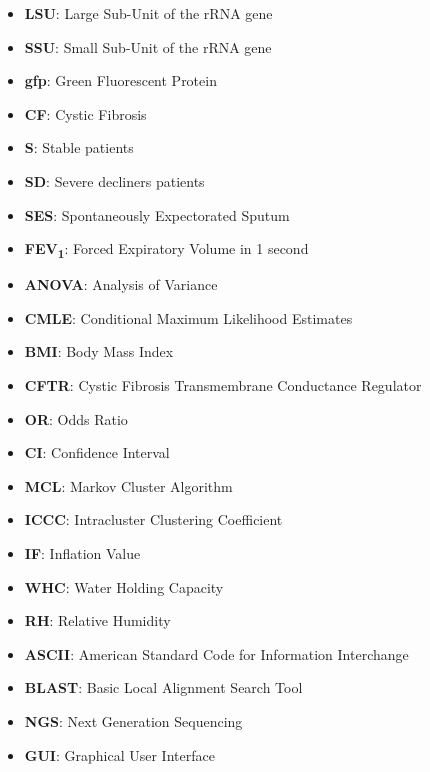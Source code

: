 \begin{itemize}
\item \textbf{LSU}: Large Sub-Unit of the rRNA gene
\item \textbf{SSU}: Small Sub-Unit of the rRNA gene
\item \textbf{gfp}: Green Fluorescent Protein
\item \textbf{CF}: Cystic Fibrosis
\item \textbf{S}: Stable patients
\item \textbf{SD}: Severe decliners patients
\item \textbf{SES}: Spontaneously Expectorated Sputum
\item \textbf{FEV\textsubscript{1}}: Forced Expiratory Volume in 1 second
\item \textbf{ANOVA}: Analysis of Variance
\item \textbf{CMLE}: Conditional Maximum Likelihood Estimates
\item \textbf{BMI}: Body Mass Index
\item \textbf{CFTR}: Cystic Fibrosis Transmembrane Conductance Regulator
\item \textbf{OR}: Odds Ratio
\item \textbf{CI}: Confidence Interval
\item \textbf{MCL}: Markov Cluster Algorithm
\item \textbf{ICCC}: Intracluster Clustering Coefficient
\item \textbf{IF}: Inflation Value
\item \textbf{WHC}: Water Holding Capacity
\item \textbf{RH}: Relative Humidity
\item \textbf{ASCII}: American Standard Code for Information Interchange
\item \textbf{BLAST}: Basic Local Alignment Search Tool
\item \textbf{NGS}: Next Generation Sequencing
\item \textbf{GUI}: Graphical User Interface
\end{itemize}